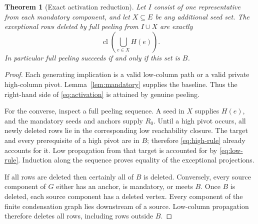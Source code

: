 \documentclass[11pt,letterpaper]{article}
\newtheorem{theorem}{Theorem}[section]
\theoremstyle{definition}
\newcommand{\cl}{\operatorname{cl}}
\begin{document}
\begin{theorem}[Exact activation reduction]\label{thm:closure}
Let $I$ consist of one representative from each mandatory component, and let
$X\subseteq E$ be any additional seed set. The exceptional rows deleted by
full peeling from $I\cup X$ are exactly
\begin{equation}\label{eq:activation}
 \cl\left(\bigcup_{e\in X}H(e)\right).
\end{equation}
In particular full peeling succeeds if and only if this set is $B$.
\end{theorem}
\begin{proof}
Each generating implication is a valid low-column path or a valid private
high-column pivot. Lemma~\ref{lem:mandatory} supplies the baseline. Thus the
right-hand side of \eqref{eq:activation} is attained by genuine peeling.

For the converse, inspect a full peeling sequence. A seed in $X$ supplies
$H(e)$, and the mandatory seeds and anchors supply $R_0$. Until a high pivot
occurs, all newly deleted rows lie in the corresponding low reachability
closure. The target and every prerequisite of a high pivot are in $B$;
therefore \eqref{eq:high-rule} already accounts for it. Low propagation from
that target is accounted for by \eqref{eq:low-rule}. Induction along the
sequence proves equality of the exceptional projections.

If all rows are deleted then certainly all of $B$ is deleted. Conversely,
every source component of $G$ either has an anchor, is mandatory, or meets
$B$. Once $B$ is deleted, each source component has a deleted vertex. Every
component of the finite condensation graph lies downstream of a source.
Low-column propagation therefore deletes all rows, including rows outside
$B$.
\end{proof}
\end{document}
